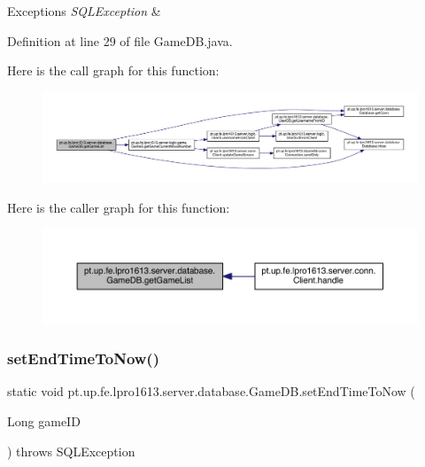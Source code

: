 \begin{DoxyExceptions}{Exceptions}
{\em S\+Q\+L\+Exception} & \\
\hline
\end{DoxyExceptions}


Definition at line 29 of file Game\+D\+B.\+java.

Here is the call graph for this function\+:
\nopagebreak
\begin{figure}[H]
\begin{center}
\leavevmode
\includegraphics[width=350pt]{classpt_1_1up_1_1fe_1_1lpro1613_1_1server_1_1database_1_1_game_d_b_a4c567854868d16ae9b919c0655be65a7_cgraph}
\end{center}
\end{figure}
Here is the caller graph for this function\+:
\nopagebreak
\begin{figure}[H]
\begin{center}
\leavevmode
\includegraphics[width=350pt]{classpt_1_1up_1_1fe_1_1lpro1613_1_1server_1_1database_1_1_game_d_b_a4c567854868d16ae9b919c0655be65a7_icgraph}
\end{center}
\end{figure}
\hypertarget{classpt_1_1up_1_1fe_1_1lpro1613_1_1server_1_1database_1_1_game_d_b_ab352e7cd06250b77274f5c4f261f8116}{}\label{classpt_1_1up_1_1fe_1_1lpro1613_1_1server_1_1database_1_1_game_d_b_ab352e7cd06250b77274f5c4f261f8116} 
\subsubsection{\texorpdfstring{set\+End\+Time\+To\+Now()}{setEndTimeToNow()}}
{\footnotesize\ttfamily static void pt.\+up.\+fe.\+lpro1613.\+server.\+database.\+Game\+D\+B.\+set\+End\+Time\+To\+Now (\begin{DoxyParamCaption}\item[{Long}]{game\+ID }\end{DoxyParamCaption}) throws S\+Q\+L\+Exception\hspace{0.3cm}{\ttfamily [static]}}


